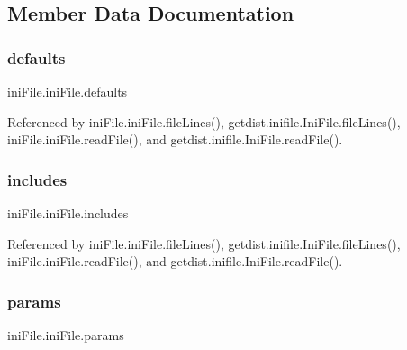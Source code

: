 \subsection{Member Data Documentation}
\mbox{\label{classiniFile_1_1iniFile_a327a685799e72ca8dd56966b0caba760}} 
\subsubsection{\texorpdfstring{defaults}{defaults}}
{\footnotesize\ttfamily ini\+File.\+ini\+File.\+defaults}



Referenced by ini\+File.\+ini\+File.\+file\+Lines(), getdist.\+inifile.\+Ini\+File.\+file\+Lines(), ini\+File.\+ini\+File.\+read\+File(), and getdist.\+inifile.\+Ini\+File.\+read\+File().

\mbox{\label{classiniFile_1_1iniFile_aa8bf1f54f5a769b7d610248edc1ae7f3}} 
\subsubsection{\texorpdfstring{includes}{includes}}
{\footnotesize\ttfamily ini\+File.\+ini\+File.\+includes}



Referenced by ini\+File.\+ini\+File.\+file\+Lines(), getdist.\+inifile.\+Ini\+File.\+file\+Lines(), ini\+File.\+ini\+File.\+read\+File(), and getdist.\+inifile.\+Ini\+File.\+read\+File().

\mbox{\label{classiniFile_1_1iniFile_a9398be892ceaca74049e1f9dfe3ce0ca}} 
\subsubsection{\texorpdfstring{params}{params}}
{\footnotesize\ttfamily ini\+File.\+ini\+File.\+params}



